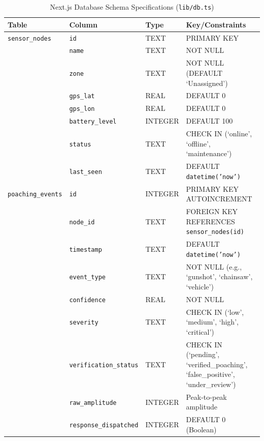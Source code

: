 \documentclass[11pt,a4paper]{article}
\begin{document}
\begin{table}[H]
    \centering
    \caption{Next.js Database Schema Specifications (\texttt{lib/db.ts})}
    \begin{tabular}{lllp{6cm}}
        \toprule
        \textbf{Table} & \textbf{Column} & \textbf{Type} & \textbf{Key/Constraints} \\
        \midrule
        \texttt{sensor\_nodes} & \texttt{id} & TEXT & PRIMARY KEY \\
                               & \texttt{name} & TEXT & NOT NULL \\
                               & \texttt{zone} & TEXT & NOT NULL (DEFAULT `Unassigned') \\
                               & \texttt{gps\_lat} & REAL & DEFAULT 0 \\
                               & \texttt{gps\_lon} & REAL & DEFAULT 0 \\
                               & \texttt{battery\_level} & INTEGER & DEFAULT 100 \\
                               & \texttt{status} & TEXT & CHECK IN (`online', `offline', `maintenance') \\
                               & \texttt{last\_seen} & TEXT & DEFAULT \texttt{datetime('now')} \\
        \midrule
        \texttt{poaching\_events} & \texttt{id} & INTEGER & PRIMARY KEY AUTOINCREMENT \\
                                  & \texttt{node\_id} & TEXT & FOREIGN KEY REFERENCES \texttt{sensor\_nodes(id)} \\
                                  & \texttt{timestamp} & TEXT & DEFAULT \texttt{datetime('now')} \\
                                  & \texttt{event\_type} & TEXT & NOT NULL (e.g., `gunshot', `chainsaw', `vehicle') \\
                                  & \texttt{confidence} & REAL & NOT NULL \\
                                  & \texttt{severity} & TEXT & CHECK IN (`low', `medium', `high', `critical') \\
                                  & \texttt{verification\_status} & TEXT & CHECK IN (`pending', `verified\_poaching', `false\_positive', `under\_review') \\
                                  & \texttt{raw\_amplitude} & INTEGER & Peak-to-peak amplitude \\
                                  & \texttt{response\_dispatched} & INTEGER & DEFAULT 0 (Boolean) \\
        \bottomrule
    \end{tabular}
\end{table}
\end{document}
